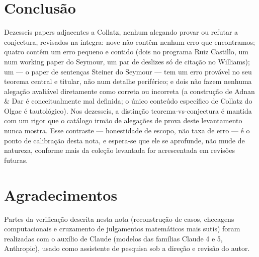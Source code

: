 \documentclass[11pt]{article}
\begin{document}
\section{Conclusão}
\label{sec:conclusion}

Dezesseis papers adjacentes a Collatz, nenhum alegando provar ou
refutar a conjectura, revisados na íntegra: nove não contêm nenhum erro
que encontramos; quatro contêm um erro pequeno e contido (dois no
programa Ruiz Castillo, um num working paper do Seymour, um par de
deslizes só de citação no Williams); um --- o paper de sentenças
Steiner do Seymour --- tem um erro provável no seu teorema central e
titular, não num detalhe periférico; e dois não fazem nenhuma alegação
avaliável diretamente como correta ou incorreta (a construção de Adnan
\& Dar é conceitualmente mal definida; o único conteúdo específico de
Collatz do Olgac é tautológico). Nos dezesseis, a distinção
teorema-vs-conjectura é mantida com um rigor que o catálogo irmão de
alegações de prova deste levantamento nunca mostra. Esse contraste ---
honestidade de escopo, não taxa de erro --- é o ponto de calibração
desta nota, e espera-se que ele se aprofunde, não mude de natureza,
conforme mais da coleção levantada for acrescentada em revisões
futuras.

\section*{Agradecimentos}

Partes da verificação descrita nesta nota (reconstrução de casos,
checagens computacionais e cruzamento de julgamentos matemáticos mais
sutis) foram realizadas com o auxílio de Claude (modelos das famílias
Claude 4 e 5, Anthropic), usado como assistente de pesquisa sob a
direção e revisão do autor.
\end{document}
